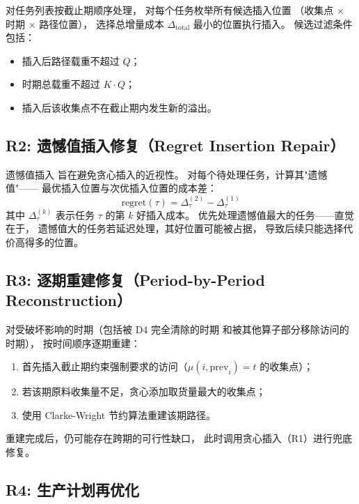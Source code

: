 \documentclass{article}
\begin{document}
对任务列表按截止期顺序处理，
对每个任务枚举所有候选插入位置
（收集点 $\times$ 时期 $\times$ 路径位置），
选择总增量成本 $\Delta_{\text{total}}$ 最小的位置执行插入。
候选过滤条件包括：

\begin{itemize}
  \item 插入后路径载重不超过 $Q$；
  \item 时期总载重不超过 $K \cdot Q$；
  \item 插入后该收集点不在截止期内发生新的溢出。
\end{itemize}

\subsection{R2: 遗憾值插入修复（Regret Insertion Repair）}

遗憾值插入 \cite{Ropke2006} 旨在避免贪心插入的近视性。
对每个待处理任务，计算其"遗憾值"——
最优插入位置与次优插入位置的成本差：
\begin{equation}
  \text{regret}(\tau) = \Delta^{(2)}_\tau - \Delta^{(1)}_\tau
  \label{eq:regret}
\end{equation}
其中 $\Delta^{(k)}_\tau$ 表示任务 $\tau$ 的第 $k$ 好插入成本。
优先处理遗憾值最大的任务——直觉在于，
遗憾值大的任务若延迟处理，其好位置可能被占据，
导致后续只能选择代价高得多的位置。

\subsection{R3: 逐期重建修复（Period-by-Period Reconstruction）}

对受破坏影响的时期（包括被 D4 完全清除的时期
和被其他算子部分移除访问的时期），
按时间顺序逐期重建：

\begin{enumerate}
  \item 首先插入截止期约束强制要求的访问（$\mu(i, \text{prev}_i) = t$ 的收集点）；
  \item 若该期原料收集量不足，贪心添加取货量最大的收集点；
  \item 使用 Clarke-Wright 节约算法重建该期路径。
\end{enumerate}

重建完成后，仍可能存在跨期的可行性缺口，
此时调用贪心插入（R1）进行兜底修复。

\subsection{R4: 生产计划再优化}
\end{document}
